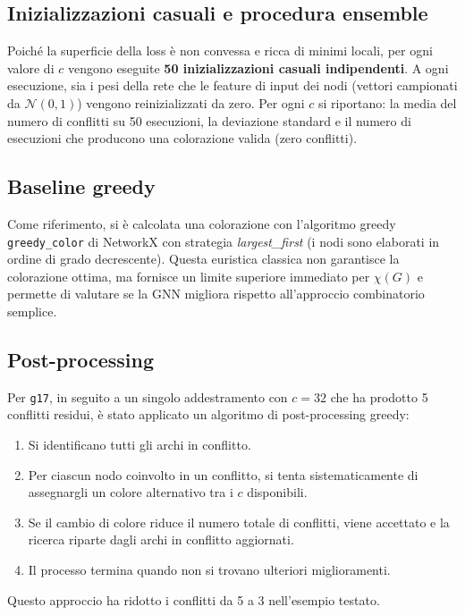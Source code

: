 \documentclass[11pt, a4paper]{article}
\begin{document}
\subsection*{Inizializzazioni casuali e procedura ensemble}

Poiché la superficie della loss è non convessa e ricca di minimi locali, per ogni valore
di $c$ vengono eseguite \textbf{50 inizializzazioni casuali indipendenti}. A ogni
esecuzione, sia i pesi della rete che le feature di input dei nodi (vettori campionati da
$\mathcal{N}(0,1)$) vengono reinizializzati da zero. Per ogni $c$ si riportano: la media
del numero di conflitti su 50 esecuzioni, la deviazione standard e il numero di esecuzioni
che producono una colorazione valida (zero conflitti).

\subsection*{Baseline greedy}

Come riferimento, si è calcolata una colorazione con l'algoritmo greedy \texttt{greedy\_color}
di NetworkX con strategia \textit{largest\_first} (i nodi sono elaborati in ordine di grado
decrescente). Questa euristica classica non garantisce la colorazione ottima, ma fornisce un
limite superiore immediato per $\chi(G)$ e permette di valutare se la GNN migliora rispetto
all'approccio combinatorio semplice.

\subsection*{Post-processing}

Per \texttt{g17}, in seguito a un singolo addestramento con $c = 32$ che ha prodotto
5 conflitti residui, è stato applicato un algoritmo di post-processing greedy:
\begin{enumerate}
    \item Si identificano tutti gli archi in conflitto.
    \item Per ciascun nodo coinvolto in un conflitto, si tenta sistematicamente di
    assegnargli un colore alternativo tra i $c$ disponibili.
    \item Se il cambio di colore riduce il numero totale di conflitti, viene accettato e
    la ricerca riparte dagli archi in conflitto aggiornati.
    \item Il processo termina quando non si trovano ulteriori miglioramenti.
\end{enumerate}
Questo approccio ha ridotto i conflitti da 5 a 3 nell'esempio testato.
\end{document}
